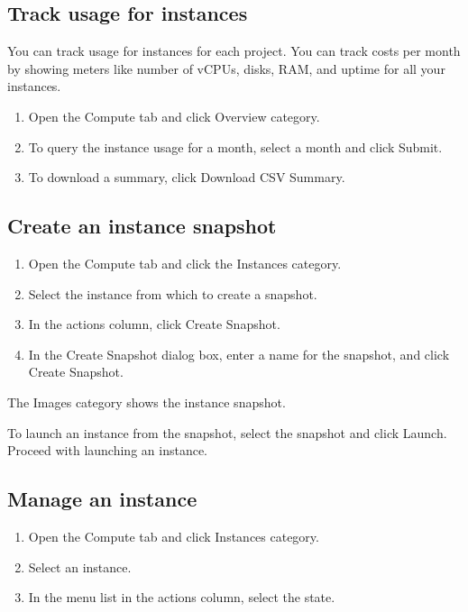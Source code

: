 \subsection*{Track usage for instances}\label{track-usage-for-instances}

You can track usage for instances for each project. You can track costs
per month by showing meters like number of vCPUs, disks, RAM, and uptime
for all your instances.

\begin{enumerate}
\item Open the Compute tab and click Overview category.
\item To query the instance usage for a month, select a month and click
  Submit.
\item To download a summary, click Download CSV Summary.
\end{enumerate}

\subsection*{Create an instance snapshot}\label{create-an-instance-snapshot}

\begin{enumerate}
\item Open the Compute tab and click the Instances
  category.
\item Select the instance from which to create a snapshot.
\item In the actions column, click Create Snapshot.
\item In the Create Snapshot dialog box, enter a name for the snapshot, and
  click Create Snapshot.
\end{enumerate}

The Images category shows the instance snapshot.

To launch an instance from the snapshot, select the snapshot and click
Launch. Proceed with launching an instance.

\subsection*{Manage an instance}\label{manage-an-instance}

\begin{enumerate}
\item Open the Compute tab and click Instances category.
\item Select an instance.
\item In the menu list in the actions column, select the state.
\end{enumerate}

